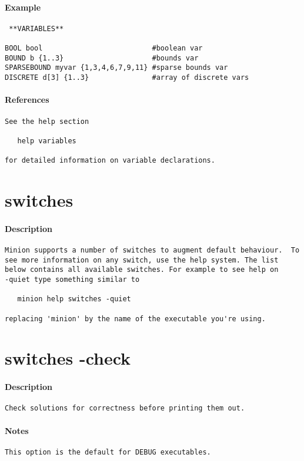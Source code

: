 \paragraph{Example}
{\footnotesize
\begin{verbatim}
 **VARIABLES**

BOOL bool                          #boolean var
BOUND b {1..3}                     #bounds var
SPARSEBOUND myvar {1,3,4,6,7,9,11} #sparse bounds var
DISCRETE d[3] {1..3}               #array of discrete vars
\end{verbatim}
}
\paragraph{References}
{\footnotesize
\begin{verbatim}
See the help section

   help variables

for detailed information on variable declarations.
\end{verbatim}
}
\section{switches}
\paragraph{Description}
{\footnotesize
\begin{verbatim}
Minion supports a number of switches to augment default behaviour.  To
see more information on any switch, use the help system. The list
below contains all available switches. For example to see help on
-quiet type something similar to

   minion help switches -quiet

replacing 'minion' by the name of the executable you're using.
\end{verbatim}
}
\section{switches -check}
\paragraph{Description}
{\footnotesize
\begin{verbatim}
Check solutions for correctness before printing them out.
\end{verbatim}
}
\paragraph{Notes}
{\footnotesize
\begin{verbatim}
This option is the default for DEBUG executables.
\end{verbatim}
}
